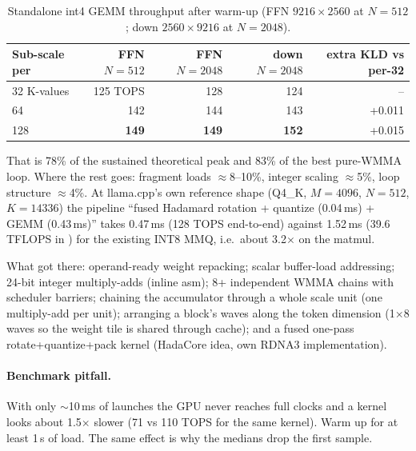 \documentclass[10pt,a4paper]{article}
\newcommand{\tx}[1]{\texttt{\detokenize{#1}}}
\begin{document}
\begin{table}[H]
\centering\small
\caption{Standalone int4 GEMM throughput after warm-up (FFN $9216\times2560$ at $N=512$; down $2560\times9216$ at $N=2048$).}
\begin{tabular}{@{}lrrrr@{}}
\toprule
Sub-scale per & FFN $N{=}512$ & FFN $N{=}2048$ & down $N{=}2048$ & extra KLD vs per-32\\
\midrule
32 K-values & 125 TOPS & 128 & 124 & --\\
64 & 142 & 144 & 143 & +0.011\\
128 & \textbf{149} & \textbf{149} & \textbf{152} & +0.015\\
\bottomrule
\end{tabular}
\end{table}
That is 78\% of the sustained theoretical peak and 83\% of the best pure-WMMA loop. Where the rest goes: fragment loads
$\approx$8--10\%, integer scaling $\approx$5\%, loop structure $\approx$4\%. At llama.cpp's own reference shape
(Q4\_K, $M{=}4096$, $N{=}512$, $K{=}14336$) the pipeline ``fused Hadamard rotation + quantize (0.04\,ms) + GEMM (0.43\,ms)''
takes 0.47\,ms (128 TOPS end-to-end) against 1.52\,ms (39.6 TFLOPS in \tx{test-backend-ops}) for the existing INT8 MMQ,
i.e.\ about 3.2$\times$ on the matmul.

What got there: operand-ready weight repacking; scalar buffer-load addressing; 24-bit integer multiply-adds (inline asm);
8+ independent WMMA chains with scheduler barriers; chaining the accumulator through a whole scale unit (one multiply-add per
unit); arranging a block's waves along the token dimension (1$\times$8 waves so the weight tile is shared through cache);
and a fused one-pass rotate+quantize+pack kernel (HadaCore idea, own RDNA3 implementation).

\paragraph{Benchmark pitfall.} With only $\sim$10\,ms of launches the GPU never reaches full clocks and a kernel looks about
1.5$\times$ slower (71 vs 110 TOPS for the same kernel). Warm up for at least 1\,s of load. The same effect is why the
\tx{llama-bench} medians drop the first sample.
\end{document}
